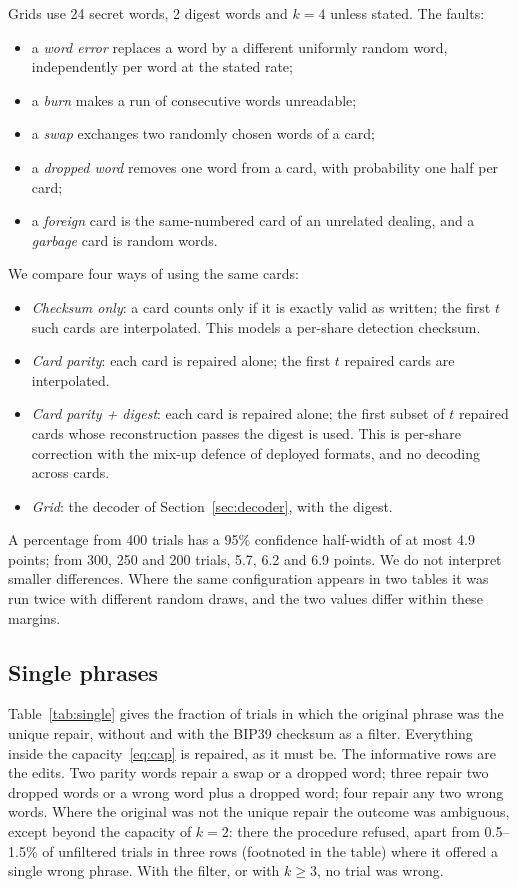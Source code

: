 \documentclass[numeric]{anvil-paper}
\begin{document}
Grids use 24 secret words, 2 digest words and $k=4$ unless stated. The faults:
\begin{itemize}
\item a \emph{word error} replaces a word by a different uniformly random
  word, independently per word at the stated rate;
\item a \emph{burn} makes a run of consecutive words unreadable;
\item a \emph{swap} exchanges two randomly chosen words of a card;
\item a \emph{dropped word} removes one word from a card, with probability
  one half per card;
\item a \emph{foreign} card is the same-numbered card of an unrelated dealing,
  and a \emph{garbage} card is random words.
\end{itemize}
We compare four ways of using the same cards:
\begin{itemize}
\item \emph{Checksum only}: a card counts only if it is exactly valid as
  written; the first $t$ such cards are interpolated. This models a per-share
  detection checksum.
\item \emph{Card parity}: each card is repaired alone; the first $t$ repaired
  cards are interpolated.
\item \emph{Card parity + digest}: each card is repaired alone; the first
  subset of $t$ repaired cards whose reconstruction passes the digest is
  used. This is per-share correction with the mix-up defence of deployed
  formats, and no decoding across cards.
\item \emph{Grid}: the decoder of Section~\ref{sec:decoder}, with the digest.
\end{itemize}
A percentage from 400 trials has a 95\% confidence half-width of at most 4.9
points; from 300, 250 and 200 trials, 5.7, 6.2 and 6.9 points. We do not
interpret smaller differences. Where the same configuration appears in two
tables it was run twice with different random draws, and the two values differ
within these margins.

\subsection{Single phrases}

Table~\ref{tab:single} gives the fraction of trials in which the original
phrase was the unique repair, without and with the BIP39 checksum as a filter.
Everything inside the capacity~\eqref{eq:cap} is repaired, as it must be. The
informative rows are the edits. Two parity words repair a swap or a dropped
word; three repair two dropped words or a wrong word plus a dropped word; four
repair any two wrong words. Where the original was not the unique repair the
outcome was ambiguous, except beyond the capacity of $k=2$: there the procedure
refused, apart from 0.5--1.5\% of unfiltered trials in three rows (footnoted in
the table) where it offered a single wrong phrase. With the filter, or with
$k\ge 3$, no trial was wrong.
\end{document}
